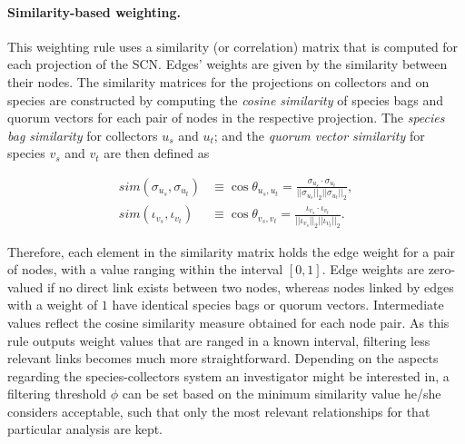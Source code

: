 {\paragraph*{Similarity-based weighting.}
This weighting rule uses a similarity (or correlation) matrix that is computed for each projection of the SCN. Edges' weights are given by the similarity between their nodes. The similarity matrices for the projections on collectors and on species are constructed by computing the  \textit{cosine similarity} of species bags and quorum vectors for each pair of nodes in the respective projection. 
The \textit{species bag similarity} for collectors $u_s$ and $u_t$; and the \textit{quorum vector similarity} for species $v_s$ and $v_t$ are then defined as

\begin{equation}
\label{equation:cosine_similarity}
\begin{split}
sim(\sigma_{u_s},\sigma_{u_t}) &\equiv
\cos \theta_{u_s,u_t} =
\frac{  \sigma_{u_s} \cdot \sigma_{u_t}  }{  ||\sigma_{u_s}||_2  ||\sigma_{u_t}||_2  }, \\
sim(\iota_{v_s},\iota_{v_t}) &\equiv
\cos \theta_{v_s,v_t} =
\frac{  \iota_{v_s} \cdot \iota_{v_t}  }{  ||\iota_{v_s}||_2  ||\iota_{v_t}||_2  }. 
\end{split}
\end{equation}

Therefore, each element in the similarity matrix holds the edge weight for a pair of nodes, with a value ranging within the interval $[0,1]$. Edge weights are zero-valued if no direct link exists between two nodes,  whereas nodes linked by edges with a weight of $1$ have identical species bags or quorum vectors. Intermediate values reflect the cosine similarity measure obtained for each node pair.
As this rule outputs weight values that are ranged in a known interval, filtering less relevant links becomes much more straightforward. Depending on the aspects regarding the species-collectors system an investigator might be interested in, a filtering threshold $\phi$ can be set based on the minimum similarity value he/she considers acceptable, such that only the most relevant relationships for that particular analysis are kept.











}
